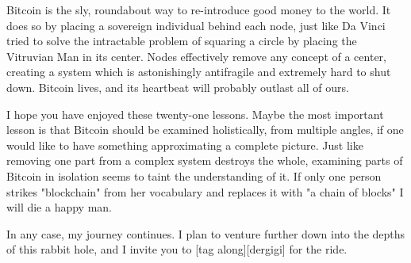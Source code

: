 
Bitcoin is the sly, roundabout way to re-introduce good money to the world. It
does so by placing a sovereign individual behind each node, just like Da Vinci
tried to solve the intractable problem of squaring a circle by placing the
Vitruvian Man in its center. Nodes effectively remove any concept of a center,
creating a system which is astonishingly antifragile and extremely hard to shut
down. Bitcoin lives, and its heartbeat will probably outlast all of ours.

I hope you have enjoyed these twenty-one lessons. Maybe the most important
lesson is that Bitcoin should be examined holistically, from multiple angles, if
one would like to have something approximating a complete picture. Just like
removing one part from a complex system destroys the whole, examining parts of
Bitcoin in isolation seems to taint the understanding of it. If only one person
strikes "blockchain" from her vocabulary and replaces it with "a chain of
blocks" I will die a happy man.

In any case, my journey continues. I plan to venture further down into the
depths of this rabbit hole, and I invite you to [tag along][dergigi] for the ride.

%
